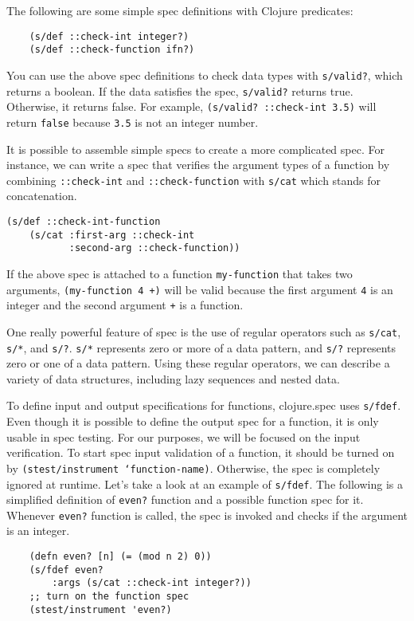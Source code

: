 \documentclass[12pt]{article}
\begin{document}
	The following are some simple spec definitions with Clojure predicates:
	\begin{verbatim}
	(s/def ::check-int integer?)
	(s/def ::check-function ifn?)
	\end{verbatim}
	You can use the above spec definitions to check data types with {\tt s/valid?}, which returns a boolean.
	If the data satisfies the spec, {\tt s/valid?} returns true. Otherwise, it returns false. For example, 
	{\tt (s/valid? ::check-int 3.5)} will return {\tt false} because {\tt 3.5} is not an integer number.
	
	It is possible to assemble simple specs to create a more complicated spec. For instance, we can write a spec that verifies 
	the argument types of a function by combining \texttt{::check-int} and \texttt{::check-function} with \texttt{s/cat} 
	which stands for concatenation. 
	\begin{verbatim}
(s/def ::check-int-function 
    (s/cat :first-arg ::check-int 
           :second-arg ::check-function))
	\end{verbatim}
	If the above spec is attached to a function {\tt my-function} that takes two arguments, 
	{\tt (my-function 4 +)} will be valid 
	because the first argument {\tt 4} is an integer and the second argument {\tt +} is a function.
	
	One really powerful feature of spec is the use of regular operators such as \texttt{s/cat}, \texttt{s/*}, and \texttt{s/?}.
	\texttt{s/*} represents zero or more of a data pattern, and \texttt{s/?} represents zero or one of a data pattern.
	Using these regular operators, we can describe a variety of data structures, including lazy sequences and nested data. 

	To define input and output specifications for functions, clojure.spec uses \texttt{s/fdef}. Even though it is possible to 
	define the output spec for a function, it is only usable in spec testing. For our purposes, we will be focused on the input 
	verification. To start spec input validation of a function, it should be turned on by \texttt{(stest/instrument `function-name)}. 
	Otherwise, the spec is completely ignored at runtime. Let's take a look at an example of \texttt{s/fdef}. The following 
	is a simplified definition of \texttt{even?} function and a possible function spec for it. Whenever \texttt{even?} function
	is called, the spec is invoked and checks if the argument is an integer.
	
	\begin{verbatim}
	(defn even? [n] (= (mod n 2) 0))
	(s/fdef even?
    	:args (s/cat ::check-int integer?))
	;; turn on the function spec
	(stest/instrument 'even?)
	\end{verbatim}
\end{document}
